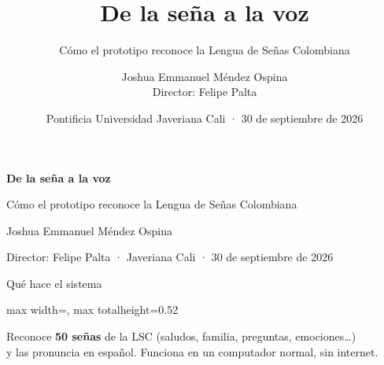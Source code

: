 \documentclass[aspectratio=169,11pt]{beamer}
\title{\textbf{De la seña a la voz}}
\subtitle{Cómo el prototipo reconoce la Lengua de Señas Colombiana}
\author{Joshua Emmanuel Méndez Ospina\\[2pt]\small Director: Felipe Palta}
\date{\small Pontificia Universidad Javeriana Cali · 30 de septiembre de 2026}
\newcommand{\idea}[1]{\vfill\begin{center}\large #1\end{center}\vspace{0.2cm}}
\begin{document}
\begin{frame}[plain]
  \vspace{1.2cm}
  {\color{azul}\fontsize{34}{40}\selectfont\bfseries De la seña a la voz\par}
  \vspace{0.3cm}
  {\Large Cómo el prototipo reconoce la Lengua de Señas Colombiana\par}
  \vspace{1.2cm}
  {\large Joshua Emmanuel Méndez Ospina\par}
  {\color{gris}Director: Felipe Palta · Javeriana Cali · 30 de septiembre de 2026\par}
\end{frame}

\begin{frame}{Qué hace el sistema}
  \vspace{0.6cm}
  \begin{center}
  \begin{adjustbox}{max width=\linewidth, max totalheight=0.52\textheight}\end{adjustbox}
  \end{center}
  \idea{Reconoce \textbf{50 señas} de la LSC (saludos, familia, preguntas, emociones\ldots)\\ y las pronuncia en español. Funciona en un computador normal, sin internet.}
\end{frame}
\end{document}

